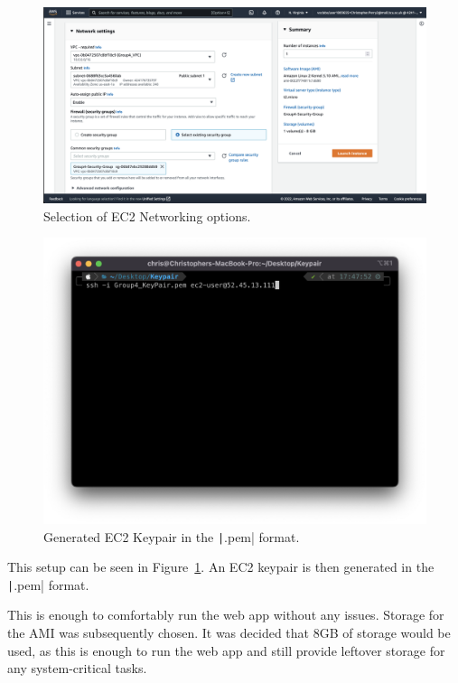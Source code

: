\clearpage
\begin{figure}[!htbp]
    \centering
    \includegraphics[width=\textwidth]{resources/ec2/create-instance-network-settings}
    \caption{Selection of EC2 Networking options.}
    \label{fig:ec2-networking}
\end{figure}

\begin{figure}[!htbp]
    \centering
    \includegraphics[width=\textwidth]{resources/ec2/keypair}
    \caption{Generated EC2 Keypair in the \texttt|.pem| format.}
    \label{fig:keypair}
\end{figure}

This setup can be seen in Figure~\ref{fig:ec2-networking}.
An EC2 keypair is then generated in the \texttt|.pem| format.

\clearpage
This is enough to comfortably run the web app without any issues.
Storage for the AMI was subsequently chosen.
It was decided that 8GB of storage would be used, as this is enough to run the web app and still provide leftover
storage for any system-critical tasks.

